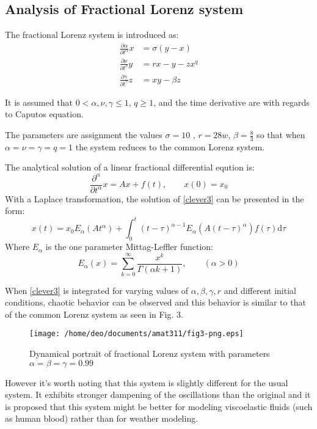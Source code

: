 \documentclass[letterpaper,titlepage,10pt]{article}
\begin{document}
\subsection{Analysis of Fractional Lorenz system}
The fractional Lorenz system is introduced as: \cite{a}
\begin{align*}
	\frac{\partial \alpha}{\partial t^{\alpha}}x &= \sigma(y-x) \\
	\frac{\partial \nu}{\partial t^{\nu}}y &= rx -y -zx^{q} \\
	\frac{\partial \gamma}{\partial t^{\gamma}}z &= xy -\beta z
\end{align*}
{\parindent0pt
It is assumed that $0<\alpha, \nu, \gamma \leq 1$, $ q\geq 1$, and the time derivative are with regards to Caputos equation.

The parameters are assignment the values $\sigma = 10$ , $r=28w$, $\beta = \frac{8}{3}$ so that when $\alpha = \nu = \gamma = q = 1$ the system reduces to the common Lorenz system. 

The analytical solution of a linear fractional differential eqution is:
\begin{equation}
	\frac{\partial^{\alpha}}{\partial t^{\alpha}}x = Ax + f(t),\qquad x(0) = x_{0} \label{clever3}
\end{equation}
With a Laplace transformation, the solution of \eqref{clever3} can be presented in the form:
\begin{equation}
	x(t) = x_{0}E_{\alpha}(At^{\alpha}) + \int_{0}^{t} (t-\tau)^{\alpha - 1}E_{\alpha}(A(t-\tau)^{\alpha})f(\tau) \text{d}\tau 
\end{equation}
Where $E_{\alpha}$ is the one parameter Mittag-Leffler function:
\begin{equation}
	E_{\alpha}(x) = \sum_{k=0}^{\infty}\frac{x^{k}}{\Gamma(\alpha k + 1)}, \qquad (\alpha > 0) 
\end{equation}

When \eqref{clever3} is integrated for varying values of $\alpha,\beta,\gamma,r$ and different initial conditions, chaotic behavior can be observed and this behavior is similar to that of the common Lorenz system as seen in Fig. 3.
 
 \begin{figure}[H]
        \centering
  \texttt{[image: /home/deo/documents/amat311/fig3-png.eps]}
     \caption{Dynamical portrait of fractional Lorenz system with parameters $\alpha = \beta = \gamma = 0.99$ \cite{a}}
\end{figure}


However it's worth noting that this system is slightly different for the usual system. It exhibits stronger dampening of the oscillations than the original and it is proposed that this system might be better for modeling viscoelastic fluids (such as human blood) \cite{a} rather than for weather modeling.

}
\end{document}
